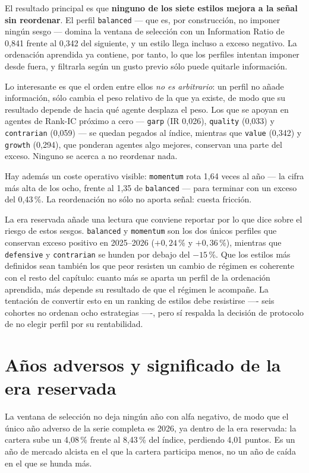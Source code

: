 El resultado principal es que \textbf{ninguno de los siete estilos mejora a la señal sin reordenar}.
El perfil \texttt{balanced} --- que es, por construcción, no imponer ningún sesgo --- domina la
ventana de selección con un Information Ratio de 0,841 frente al 0,342 del siguiente, y un estilo
llega incluso a exceso negativo. La ordenación aprendida ya contiene, por tanto, lo que los perfiles
intentan imponer desde fuera, y filtrarla según un gusto previo sólo puede quitarle información.

Lo interesante es que el orden entre ellos \emph{no es arbitrario}: un perfil no añade información,
sólo cambia el peso relativo de la que ya existe, de modo que su resultado depende de hacia qué
agente desplaza el peso. Los que se apoyan en agentes de Rank-IC próximo a cero --- \texttt{garp}
(IR 0,026), \texttt{quality} (0,033) y \texttt{contrarian} (0,059) --- se quedan pegados al índice,
mientras que \texttt{value} (0,342) y \texttt{growth} (0,294), que ponderan agentes algo mejores,
conservan una parte del exceso. Ninguno se acerca a no reordenar nada.

Hay además un coste operativo visible: \texttt{momentum} rota 1,64 veces al año
--- la cifra más alta de los ocho, frente al 1,35 de \texttt{balanced} --- para terminar con un
exceso del 0,43\,\%. La reordenación no sólo no aporta señal: cuesta fricción.

La era reservada añade una lectura que conviene reportar por lo que dice sobre el riesgo de estos
sesgos. \texttt{balanced} y \texttt{momentum} son los dos únicos perfiles que conservan exceso
positivo en 2025--2026 ($+0{,}24$\,\% y $+0{,}36$\,\%), mientras que \texttt{defensive} y
\texttt{contrarian} se hunden por debajo del $-15$\,\%. Que los estilos más definidos sean también
los que peor resisten un cambio de régimen es coherente con el resto del capítulo: cuanto más se
aparta un perfil de la ordenación aprendida, más depende su resultado de que el régimen le
acompañe. La tentación de convertir esto en un ranking de estilos debe resistirse ---- seis cohortes
no ordenan ocho estrategias ----, pero sí respalda la decisión de protocolo de no elegir perfil por
su rentabilidad.

\section{Años adversos y significado de la era reservada}
\label{sec:era-reservada}

La ventana de selección no deja ningún año con alfa negativo, de modo que el único año adverso de la
serie completa es 2026, ya dentro de la era reservada: la cartera sube un 4,08\,\% frente al
8,43\,\% del índice, perdiendo 4,01 puntos. Es un año de mercado alcista en el que la cartera
participa menos, no un año de caída en el que se hunda más.


